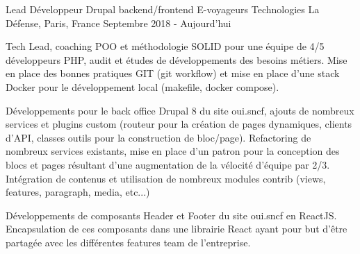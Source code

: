 \cventry
{Lead Développeur Drupal backend/frontend} %
{E-voyageurs Technologies} %
{La Défense, Paris, France} %
{Septembre 2018 - Aujourd'hui} %
{
\begin{cvitems} %
    \item
    {
        Tech Lead, coaching POO et méthodologie SOLID pour une équipe de 4/5 développeurs PHP, audit et études
        de développements des besoins métiers. Mise en place des bonnes pratiques GIT (git workflow) et mise en place
        d'une stack Docker pour le développement local (makefile, docker compose).
    }
    \item
    {
        Développements pour le back office Drupal 8 du site oui.sncf, ajouts de nombreux services et plugins custom
        (routeur pour la création de pages dynamiques, clients d’API, classes outils pour la construction de bloc/page).
        Refactoring de nombreux services existants, mise en place d’un patron pour la conception des blocs et pages
        résultant d'une augmentation de la vélocité d’équipe par 2/3. Intégration de contenus et utilisation de nombreux
        modules contrib (views, features, paragraph, media, etc...)
    }
    \item
    {
        Développements de composants Header et Footer du site oui.sncf en ReactJS. Encapsulation de ces composants dans
        une librairie React ayant pour but d’être partagée avec les différentes features team de l’entreprise.
    }
\end{cvitems}
}
